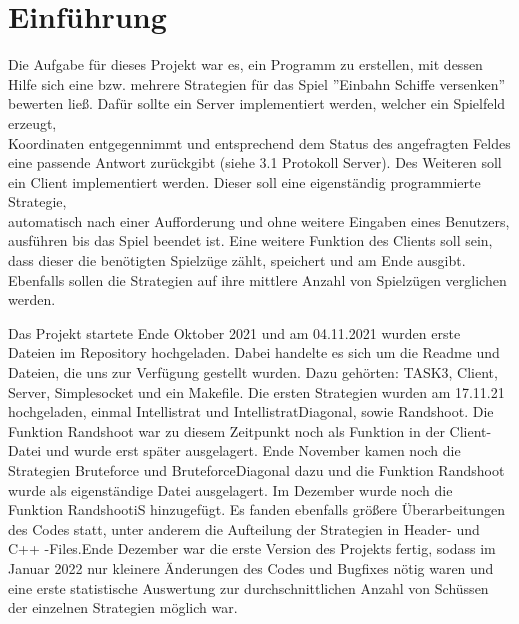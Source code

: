 \section{Einführung}

Die Aufgabe für dieses Projekt war es, ein Programm zu erstellen, mit dessen Hilfe sich eine bzw. mehrere Strategien für das Spiel ''Einbahn Schiffe versenken'' bewerten ließ. Dafür 
sollte 
ein Server implementiert werden, welcher ein Spielfeld erzeugt,\\ Koordinaten entgegennimmt und entsprechend dem Status des angefragten Feldes eine passende Antwort zurückgibt (siehe 3.1 Protokoll Server). 
Des Weiteren soll ein Client implementiert werden.
Dieser soll eine eigenständig programmierte Strategie, \\
automatisch nach einer Aufforderung und ohne weitere Eingaben eines Benutzers,\\ ausführen bis das Spiel beendet ist. 
Eine weitere Funktion des Clients soll sein, \\dass dieser die benötigten Spielzüge zählt, speichert und am Ende ausgibt. Ebenfalls sollen die 
Strategien auf ihre mittlere Anzahl von Spielzügen verglichen werden.\newline

Das Projekt startete Ende Oktober 2021 und am 04.11.2021 wurden erste Dateien im Repository hochgeladen.\newline
Dabei handelte es sich um die Readme und Dateien, die uns zur Verfügung gestellt wurden.
Dazu gehörten: TASK3, Client, Server, Simplesocket und ein Makefile.\newline
\newline
Die ersten Strategien wurden am 17.11.21 hochgeladen, einmal Intellistrat und \newline IntellistratDiagonal, sowie Randshoot.
Die Funktion Randshoot war zu diesem Zeitpunkt noch als Funktion in der Client-Datei und wurde erst später ausgelagert.\newline
\newline
Ende November kamen noch die Strategien Bruteforce und BruteforceDiagonal dazu und die Funktion Randshoot wurde als eigenständige Datei ausgelagert.\newline
\newline
Im Dezember wurde noch die Funktion RandshootiS hinzugefügt. Es fanden ebenfalls größere Überarbeitungen des Codes statt, unter anderem die Aufteilung der Strategien in Header- und C++ 
-Files.\newline Ende Dezember war die erste Version des Projekts fertig, sodass im Januar 2022 nur kleinere Änderungen des Codes und Bugfixes nötig waren und eine erste statistische 
Auswertung zur durchschnittlichen Anzahl von Schüssen der einzelnen Strategien möglich war. 

